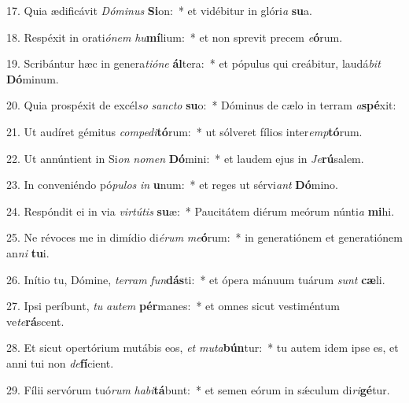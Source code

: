 17. Quia ædificávit \textit{Dó}\textit{mi}\textit{nus} \textbf{Si}on:~*  et vidébitur in glóri\textit{a} \textbf{su}a.\

18. Respéxit in orati\textit{ó}\textit{nem} \textit{hu}\textbf{mí}lium:~*  et non sprevit precem \textit{e}\textbf{ó}rum.\

19. Scribántur hæc in genera\textit{ti}\textit{ó}\textit{ne} \textbf{ál}tera:~*  et pópulus qui creábitur, laudá\textit{bit} \textbf{Dó}minum.\

20. Quia prospéxit de excél\textit{so} \textit{sanc}\textit{to} \textbf{su}o:~*  Dóminus de cælo in terram \textit{a}\textbf{spé}xit:\

21. Ut audíret gémitus \textit{com}\textit{pe}\textit{di}\textbf{tó}rum:~*  ut sólveret fílios inter\textit{emp}\textbf{tó}rum.\

22. Ut annúntient in Si\textit{on} \textit{no}\textit{men} \textbf{Dó}mini:~*  et laudem ejus in \textit{Je}\textbf{rú}salem.\

23. In conveniéndo pó\textit{pu}\textit{los} \textit{in} \textbf{u}num:~*  et reges ut sérvi\textit{ant} \textbf{Dó}mino.\

24. Respóndit ei in via \textit{vir}\textit{tú}\textit{tis} \textbf{su}æ:~*  Paucitátem diérum meórum núnti\textit{a} \textbf{mi}hi.\

25. Ne révoces me in dimídio di\textit{é}\textit{rum} \textit{me}\textbf{ó}rum:~*  in generatiónem et generatiónem an\textit{ni} \textbf{tu}i.\

26. Inítio tu, Dómine, \textit{ter}\textit{ram} \textit{fun}\textbf{dás}ti:~*  et ópera mánuum tuárum \textit{sunt} \textbf{cæ}li.\

27. Ipsi períbunt, \textit{tu} \textit{au}\textit{tem} \textbf{pér}manes:~*  et omnes sicut vestiméntum ve\textit{te}\textbf{rá}scent.\

28. Et sicut opertórium mutábis eos, \textit{et} \textit{mu}\textit{ta}\textbf{bún}tur:~*  tu autem idem ipse es, et anni tui non \textit{de}\textbf{fí}cient.\

29. Fílii servórum tuó\textit{rum} \textit{ha}\textit{bi}\textbf{tá}bunt:~*  et semen eórum in sǽculum di\textit{ri}\textbf{gé}tur.\

